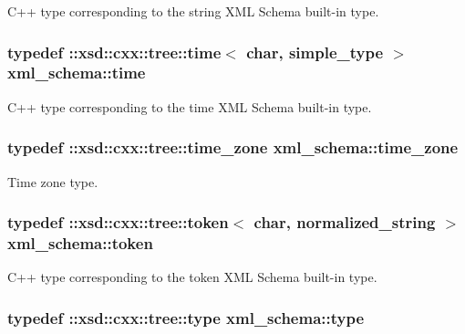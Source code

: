 C++ type corresponding to the string X\+M\+L Schema built-\/in type. 

\hypertarget{namespacexml__schema_a75a88454d26d1fbbe712e22e9e994cee}{}
\subsubsection[{time}]{\setlength{\rightskip}{0pt plus 5cm}typedef \+::xsd\+::cxx\+::tree\+::time$<$ char, {\bf simple\+\_\+type} $>$ {\bf xml\+\_\+schema\+::time}}\label{namespacexml__schema_a75a88454d26d1fbbe712e22e9e994cee}


C++ type corresponding to the time X\+M\+L Schema built-\/in type. 

\hypertarget{namespacexml__schema_a8e57a44a0fd5762cb4132689a635d6c3}{}
\subsubsection[{time\+\_\+zone}]{\setlength{\rightskip}{0pt plus 5cm}typedef \+::xsd\+::cxx\+::tree\+::time\+\_\+zone {\bf xml\+\_\+schema\+::time\+\_\+zone}}\label{namespacexml__schema_a8e57a44a0fd5762cb4132689a635d6c3}


Time zone type. 

\hypertarget{namespacexml__schema_abdb824cb755f58704a95b28f017dd0f7}{}
\subsubsection[{token}]{\setlength{\rightskip}{0pt plus 5cm}typedef \+::xsd\+::cxx\+::tree\+::token$<$ char, {\bf normalized\+\_\+string} $>$ {\bf xml\+\_\+schema\+::token}}\label{namespacexml__schema_abdb824cb755f58704a95b28f017dd0f7}


C++ type corresponding to the token X\+M\+L Schema built-\/in type. 

\hypertarget{namespacexml__schema_a3d277dc807f2e4ec4261dcef5c04a836}{}
\subsubsection[{type}]{\setlength{\rightskip}{0pt plus 5cm}typedef \+::xsd\+::cxx\+::tree\+::type {\bf xml\+\_\+schema\+::type}}\label{namespacexml__schema_a3d277dc807f2e4ec4261dcef5c04a836}


